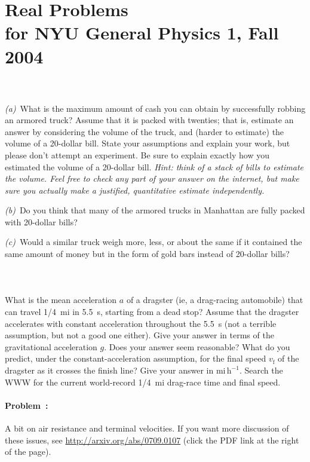 \documentclass[12pt]{article}
\newcounter{problem}
\begin{document}
\section*{Real Problems \\
          for NYU General Physics 1, Fall 2004}

\paragraph{\problemname~\theproblem}
\textsl{(a)}~What is the maximum amount of cash you can obtain by
successfully robbing an armored truck?  Assume that it is packed with
twenties; that is, estimate an answer by considering the volume of the
truck, and (harder to estimate) the volume of a 20-dollar bill.  State
your assumptions and explain your work, but please don't attempt an
experiment.  Be sure to explain exactly how you estimated the volume
of a 20-dollar bill.  \emph{Hint: think of a stack of bills to
  estimate the volume.  Feel free to \emph{check} any part of your
  answer on the internet, but make sure you actually make a justified,
  quantitative estimate independently.}

\textsl{(b)}~Do you think that many of the armored trucks in Manhattan
are fully packed with 20-dollar bills?

\textsl{(c)}~Would a similar truck weigh more, less, or about the same
if it contained the same amount of money but in the form of gold bars
instead of 20-dollar bills?

\paragraph{\problemname~\theproblem}

What is the mean acceleration $a$ of a dragster (ie, a drag-racing
automobile) that can travel 1/4~mi in 5.5~s, starting from a dead
stop?  Assume that the dragster accelerates with constant acceleration
throughout the 5.5~s (not a terrible assumption, but not a good one
either).  Give your answer in terms of the gravitational acceleration
$g$.  Does your answer seem reasonable?  What do you predict, under
the constant-acceleration assumption, for the final speed
$v_\mathrm{f}$ of the dragster as it crosses the finish line?  Give
your answer in $\mathrm{mi\,h^{-1}}$.  Search the WWW for the current
world-record 1/4~mi drag-race time and final speed.

\paragraph{Problem~\theproblem:}%
A bit on air resistance and terminal velocities. If you want more
discussion of these issues, see \url{http://arxiv.org/abs/0709.0107}
(click the PDF link at the right of the page).
\end{document}
